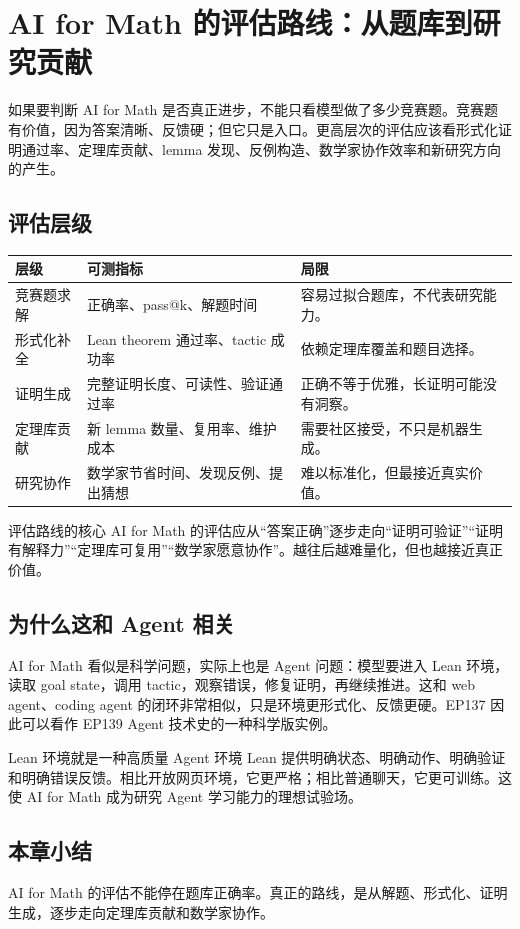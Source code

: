 \section{AI for Math 的评估路线：从题库到研究贡献}

如果要判断 AI for Math 是否真正进步，不能只看模型做了多少竞赛题。竞赛题有价值，因为答案清晰、反馈硬；但它只是入口。更高层次的评估应该看形式化证明通过率、定理库贡献、lemma 发现、反例构造、数学家协作效率和新研究方向的产生。

\subsection{评估层级}

\noindent\begin{longtable}{p{}p{}p{}}
\toprule
层级 & 可测指标 & 局限 \\
\midrule
竞赛题求解 & 正确率、pass@k、解题时间 & 容易过拟合题库，不代表研究能力。 \\
形式化补全 & Lean theorem 通过率、tactic 成功率 & 依赖定理库覆盖和题目选择。 \\
证明生成 & 完整证明长度、可读性、验证通过率 & 正确不等于优雅，长证明可能没有洞察。 \\
定理库贡献 & 新 lemma 数量、复用率、维护成本 & 需要社区接受，不只是机器生成。 \\
研究协作 & 数学家节省时间、发现反例、提出猜想 & 难以标准化，但最接近真实价值。 \\
\bottomrule
\end{longtable}

\begin{importantbox}{评估路线的核心}
AI for Math 的评估应从“答案正确”逐步走向“证明可验证”“证明有解释力”“定理库可复用”“数学家愿意协作”。越往后越难量化，但也越接近真正价值。
\end{importantbox}

\subsection{为什么这和 Agent 相关}

AI for Math 看似是科学问题，实际上也是 Agent 问题：模型要进入 Lean 环境，读取 goal state，调用 tactic，观察错误，修复证明，再继续推进。这和 web agent、coding agent 的闭环非常相似，只是环境更形式化、反馈更硬。EP137 因此可以看作 EP139 Agent 技术史的一种科学版实例。

\begin{knowledgebox}{Lean 环境就是一种高质量 Agent 环境}
Lean 提供明确状态、明确动作、明确验证和明确错误反馈。相比开放网页环境，它更严格；相比普通聊天，它更可训练。这使 AI for Math 成为研究 Agent 学习能力的理想试验场。
\end{knowledgebox}

\subsection{本章小结}

AI for Math 的评估不能停在题库正确率。真正的路线，是从解题、形式化、证明生成，逐步走向定理库贡献和数学家协作。


